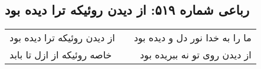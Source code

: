\begin{center}
\section*{رباعی شماره ۵۱۹: از دیدن روئیکه ترا دیده بود}
\label{sec:0519}
\begin{longtable}{l p{0.5cm} r}
از دیدن روئیکه ترا دیده بود
&&
ما را به خدا نور دل و دیده بود
\\
خاصه روئیکه از ازل تا بابد
&&
از دیدن روی تو نه ببریده بود
\\
\end{longtable}
\end{center}
